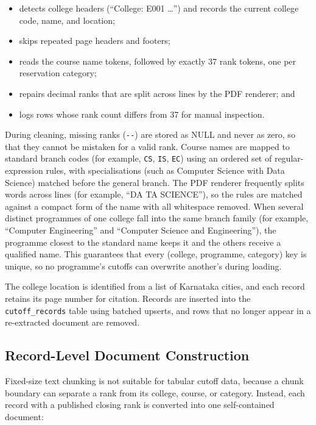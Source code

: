 \documentclass[conference]{IEEEtran}
\begin{document}
\begin{itemize}
    \item detects college headers (``College: E001 \ldots'')
    and records the current college code, name, and location;
    \item skips repeated page headers and footers;
    \item reads the course name tokens, followed by exactly
    37 rank tokens, one per reservation category;
    \item repairs decimal ranks that are split across lines
    by the PDF renderer; and
    \item logs rows whose rank count differs from 37 for
    manual inspection.
\end{itemize}

During cleaning, missing ranks (\texttt{-{}-}) are stored as NULL and
never as zero, so that they cannot be mistaken for a valid rank.
Course names are mapped to standard branch codes (for example,
\texttt{CS}, \texttt{IS}, \texttt{EC}) using an ordered set of
regular-expression rules, with specialisations (such as Computer
Science with Data Science) matched before the general branch. The
PDF renderer frequently splits words across lines (for example,
``DA TA SCIENCE''), so the rules are matched against a compact form of
the name with all whitespace removed. When several distinct
programmes of one college fall into the same branch family (for
example, ``Computer Engineering'' and ``Computer Science and
Engineering''), the programme closest to the standard name keeps it
and the others receive a qualified name. This guarantees that every
(college, programme, category) key is unique, so no programme's
cutoffs can overwrite another's during loading.

The college location is identified from a list of Karnataka cities,
and each record retains its page number for citation. Records are
inserted into the \texttt{cutoff\_records} table using batched
upserts, and rows that no longer appear in a re-extracted document
are removed.

\subsection{Record-Level Document Construction}

Fixed-size text chunking is not suitable for tabular cutoff data,
because a chunk boundary can separate a rank from its college,
course, or category. Instead, each record with a published
closing rank is converted into one self-contained document:
\end{document}
